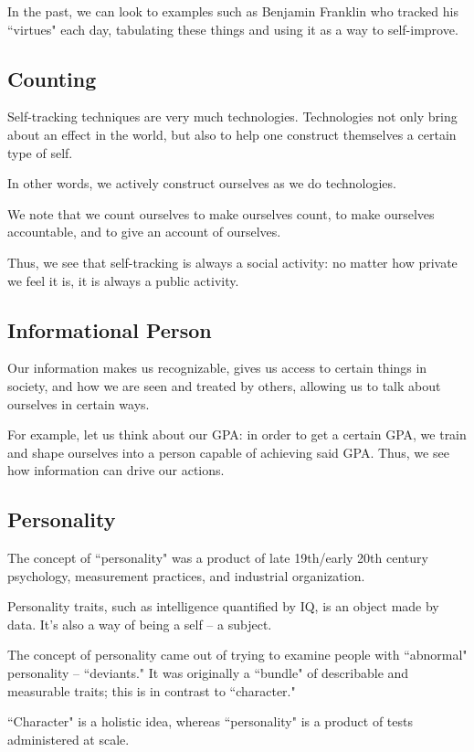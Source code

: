 \documentclass[openany]{book}
\begin{document}
In the past, we can look to examples such as Benjamin Franklin who tracked his ``virtues" each day, tabulating these things and using it as a way to self-improve.

\subsection{Counting}
Self-tracking techniques are very much technologies. Technologies not only bring about an effect in the world, but also to help one construct themselves a certain type of self.

In other words, we actively construct ourselves as we do technologies.

We note that we count ourselves to make ourselves count, to make ourselves accountable, and to give an account of ourselves.

Thus, we see that self-tracking is always a social activity: no matter how private we feel it is, it is always a public activity.

\subsection{Informational Person}
Our information makes us recognizable, gives us access to certain things in society, and how we are seen and treated by others, allowing us to talk about ourselves in certain ways.

For example, let us think about our GPA: in order to get a certain GPA, we train and shape ourselves into a person capable of achieving said GPA. Thus, we see how information can drive our actions.

\subsection{Personality}
The concept of ``personality" was a product of late 19th/early 20th century psychology, measurement practices, and industrial organization.

Personality traits, such as intelligence quantified by IQ, is an object made by data. It's also a way of being a self -- a subject.

The concept of personality came out of trying to examine people with ``abnormal" personality -- ``deviants." It was originally a ``bundle" of describable and measurable traits; this is in contrast to ``character."

``Character" is a holistic idea, whereas ``personality" is a product of tests administered at scale.
\end{document}
